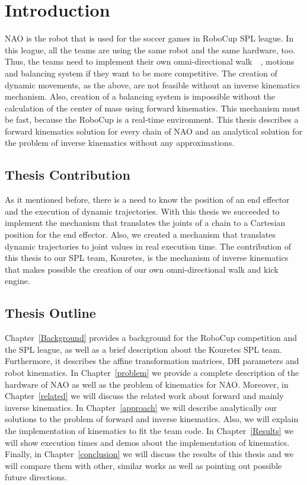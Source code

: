 \chapter{Introduction}
\label{intro}
NAO is the robot that is used for the soccer games in RoboCup SPL league. In this league, all the teams are using the same robot and the same hardware, too. Thus, the teams need to implement their own omni-directional walk~\cite{naowalk}~\cite{bhumanwalk}, motions and balancing system if they want to be more competitive. The creation of dynamic movements, as the above, are not feasible without an inverse kinematics mechanism. Also, creation of a balancing system is impossible without the calculation of the center of mass using forward kinematics. This mechanism must be fast, because the RoboCup is a real-time environment. This thesis describes a forward kinematics solution for every chain of NAO and an analytical solution for the problem of inverse kinematics without any approximations.

\section{Thesis Contribution}
As it mentioned before, there is a need to know the position of an end effector and the execution of dynamic trajectories. With this thesis we succeeded to implement the mechanism that translates the joints of a chain to a Cartesian position for the end effector. Also, we created a mechanism that translates dynamic trajectories to joint values in real execution time. The contribution of this thesis to our SPL team, Kouretes, is the mechanism of inverse kinematics that makes possible the creation of our own omni-directional walk and kick engine.

\section{Thesis Outline}
Chapter~\ref{Background} provides a background for the RoboCup competition and the SPL league, as well as a brief description about the Kouretes SPL team. Furthermore, it describes the affine transformation matrices, DH parameters and robot kinematics. In Chapter~\ref{problem} we provide a complete description of the hardware of NAO as well as the problem of kinematics for NAO. Moreover, in Chapter~\ref{related} we will discuss the related work about forward and mainly inverse kinematics. In Chapter~\ref{approach} we will describe analytically our solutions to the problem of forward and inverse kinematics. Also, we will explain the implementation of kinematics to fit the team code. In Chapter~\ref{Results} we will show execution times and demos about the implementation of kinematics. Finally, in Chapter~\ref{conclusion} we will discuss the results of this thesis and we will compare them with other, similar works as well as pointing out possible future directions.

